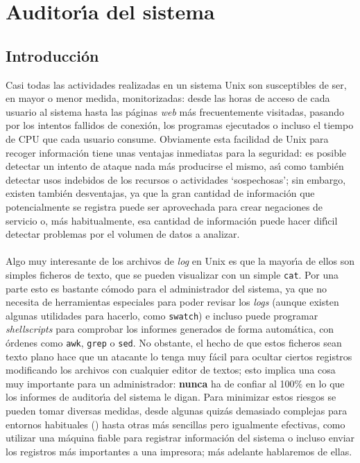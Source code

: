 \chapter{Auditor\'{\i}a del sistema}
\section{Introducci\'on}
Casi todas las actividades realizadas en un sistema Unix son susceptibles de
ser, en mayor o menor medida, monitorizadas: desde las horas de acceso de cada
usuario al sistema hasta las p\'aginas {\it web} m\'as frecuentemente visitadas,
pasando por los intentos fallidos de conexi\'on, los programas ejecutados
o incluso el tiempo de CPU que cada usuario consume. Obviamente esta facilidad
de Unix para recoger informaci\'on tiene unas ventajas inmediatas para la 
seguridad: es posible detectar un intento de ataque nada m\'as producirse el 
mismo, as\'{\i} como tambi\'en detectar usos indebidos de los recursos o 
actividades `sospechosas'; sin embargo, existen tambi\'en desventajas, ya que
la gran cantidad de informaci\'on que potencialmente se registra puede ser 
aprovechada para crear negaciones de servicio o, m\'as habitualmente, esa 
cantidad de informaci\'on puede hacer dif\'{\i}cil detectar problemas por el
volumen de datos a analizar.\\
\\Algo muy interesante de los archivos de {\it log} en Unix es que la 
mayor\'{\i}a de ellos son simples ficheros de texto, que se pueden visualizar
con un simple {\tt cat}. Por una 
parte esto es bastante c\'omodo para el administrador del sistema, ya que no
necesita de herramientas especiales para poder revisar los {\it logs} (aunque
existen algunas utilidades para hacerlo, como {\tt swatch}) e incluso 
puede programar {\it shellscripts} para comprobar los informes generados de 
forma autom\'atica, con \'ordenes como {\tt awk}, {\tt grep} o {\tt sed}. No
obstante, el hecho de que estos ficheros sean texto plano hace que un atacante 
lo tenga muy f\'acil para ocultar ciertos registros modificando los archivos con
cualquier editor de textos; esto implica una cosa muy importante para un 
administrador: {\bf nunca} ha de confiar al 100\% en lo que los informes de
auditor\'{\i}a del sistema le digan. Para minimizar estos riesgos se pueden 
tomar diversas medidas, desde algunas quiz\'as demasiado complejas para 
entornos habituales (\cite{kn:sch98}) hasta otras m\'as sencillas pero 
igualmente efectivas, como utilizar una m\'aquina fiable para registrar 
informaci\'on del sistema o incluso enviar los registros m\'as importantes a 
una impresora; m\'as adelante hablaremos de ellas.
